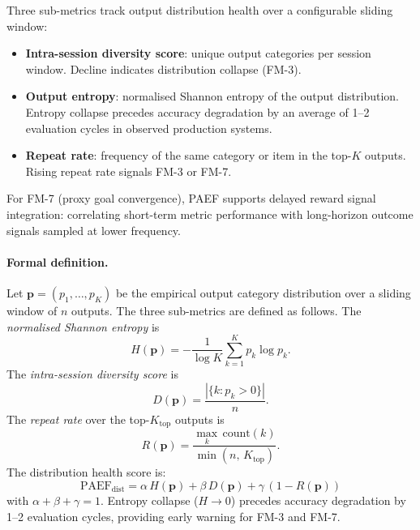 \documentclass{article}
\begin{document}
Three sub-metrics track output distribution health over a configurable sliding
window:
\begin{itemize}
  \item \textbf{Intra-session diversity score}: unique output categories per
        session window.  Decline indicates distribution collapse (FM-3).
  \item \textbf{Output entropy}: normalised Shannon entropy of the output
        distribution.  Entropy collapse precedes accuracy degradation by an
        average of 1--2 evaluation cycles in observed production systems.
  \item \textbf{Repeat rate}: frequency of the same category or item in the
        top-$K$ outputs.  Rising repeat rate signals FM-3 or FM-7.
\end{itemize}

For FM-7 (proxy goal convergence), PAEF supports delayed reward signal
integration: correlating short-term metric performance with long-horizon
outcome signals sampled at lower frequency.

\paragraph{Formal definition.}
Let $\mathbf{p} = (p_1, \ldots, p_K)$ be the empirical output category distribution
over a sliding window of $n$ outputs.  The three sub-metrics are defined as
follows.  The \emph{normalised Shannon entropy} is
\begin{equation}
  H(\mathbf{p}) = -\frac{1}{\log K} \sum_{k=1}^{K} p_k \log p_k.
\end{equation}
The \emph{intra-session diversity score} is
\begin{equation}
  D(\mathbf{p}) = \frac{|\{k : p_k > 0\}|}{n}.
\end{equation}
The \emph{repeat rate} over the top-$K_{\text{top}}$ outputs is
\begin{equation}
  R(\mathbf{p}) = \frac{\max_k\, \text{count}(k)}{\min(n,\, K_{\text{top}})}.
\end{equation}
The distribution health score is:
\begin{equation}
  \text{PAEF}_{\text{dist}} = \alpha\, H(\mathbf{p}) + \beta\, D(\mathbf{p})
                              + \gamma\, (1 - R(\mathbf{p}))
\end{equation}
with $\alpha + \beta + \gamma = 1$.  Entropy collapse ($H \to 0$) precedes
accuracy degradation by 1--2 evaluation cycles, providing early warning for
FM-3 and FM-7.
\end{document}
